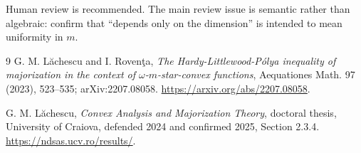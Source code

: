 \documentclass[11pt]{article}
\begin{document}
Human review is recommended.  The main review issue is semantic rather than
algebraic: confirm that ``depends only on the dimension'' is intended to mean
uniformity in \(m\).

\begin{thebibliography}{9}
G. M. L\u{a}chescu and I. Roven\c{t}a,
\emph{The Hardy-Littlewood-P\'{o}lya inequality of majorization in the context
of \(\omega\)-\(m\)-star-convex functions},
Aequationes Math. 97 (2023), 523--535; arXiv:2207.08058.
\url{https://arxiv.org/abs/2207.08058}.

G. M. L\u{a}chescu,
\emph{Convex Analysis and Majorization Theory}, doctoral thesis, University
of Craiova, defended 2024 and confirmed 2025, Section 2.3.4.
\url{https://ndsas.ucv.ro/results/}.
\end{thebibliography}
\end{document}
